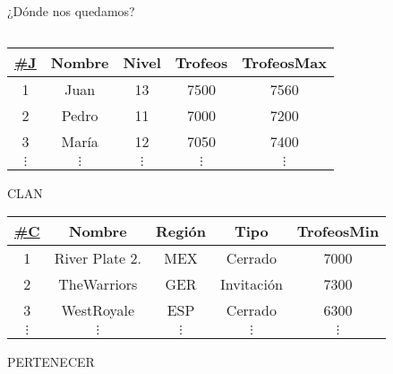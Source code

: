 \begin{frame}{¿D\'onde nos quedamos?}
\begin{columns}[T]
\begin{column}{0.48\linewidth}
\begin{center}
\begin{tiny}
                    \begin{tabular}{|c|c|c|c|c|}
                        \hline
                        \underline{\#J} & Nombre & Nivel& Trofeos & TrofeosMax\\
                        \hline
                        1 & Juan & 13 & 7500 & 7560\\
                        \hline
                        2 & Pedro &  11 & 7000 & 7200 \\
                        \hline
                        3 & Mar\'ia & 12  & 7050 & 7400\\
                        \hline
                        $\vdots$ & $\vdots$ & $\vdots$ & $\vdots$ & $\vdots$\\
                        \hline
                        
                    \end{tabular}
                \end{tiny}
                
                \vspace{3mm}

                \tiny{CLAN}
                \vspace{2mm}

                \begin{tiny}
                    \begin{tabular}{|c|c|c|c|c|}
                        \hline
                        \underline{\#C} & Nombre & Regi\'on & Tipo & TrofeosMin\\
                        \hline
                        1 & River Plate 2. & MEX & Cerrado & 7000 \\
                        \hline
                        2 & TheWarriors & GER & Invitaci\'on & 7300\\
                        \hline
                        3 & WestRoyale &  ESP & Cerrado & 6300\\
                        \hline
                        $\vdots$ & $\vdots$ & $\vdots$ & $\vdots$ & $\vdots$\\
                        \hline
                        
                    \end{tabular}
                \end{tiny}
                
                \vspace{3mm}

                \tiny{PERTENECER}
                \vspace{2mm}


\end{center}
\end{column}
\end{columns}
\end{frame}
